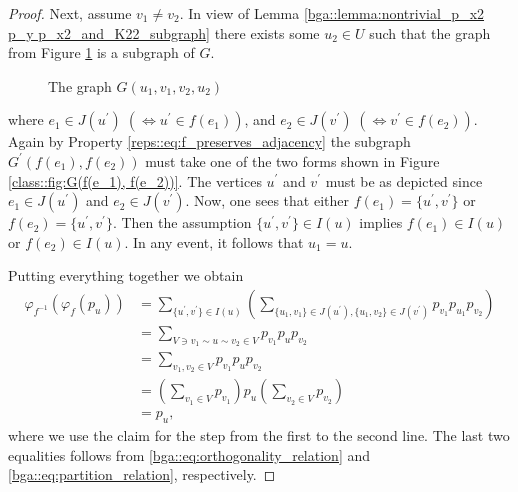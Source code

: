 \documentclass[10pt,a4paper]{amsart}
\begin{document}
\begin{proof}
    Next, assume $v_1 \neq v_2$. In view of Lemma \ref{bga::lemma:nontrivial_p_x2 p_y p_x2_and_K22_subgraph} there exists some $u_2 \in U$ such that the graph from Figure \ref{class::fig:G(u_1, v_1, v_2, u_2)} is a subgraph of $G$. %
%
    \begin{figure}[htb]
        \caption{The graph $G(u_1, v_1, v_2, u_2)$}
        \label{class::fig:G(u_1, v_1, v_2, u_2)}
    \end{figure}
%  
    where $e_1 \in J(u^\prime)\; ( \Leftrightarrow u^\prime \in f(e_1))$, and $e_2 \in J(v^\prime)\; ( \Leftrightarrow v^\prime \in f(e_2))$.
    Again by Property \eqref{reps::eq:f_preserves_adjacency} the subgraph $G^\prime(f(e_1), f(e_2))$ must take one of the two forms shown in Figure \ref{class::fig:G(f(e_1), f(e_2))}. The vertices $u^\prime$ and $v^\prime$ must be as depicted since $e_1 \in J(u^\prime)$ and $e_2 \in J(v^\prime)$. Now, one sees that either $f(e_1) = \{u^\prime, v^\prime\}$ or $f(e_2) = \{u^\prime, v^\prime\}$. Then the assumption $\{u^\prime, v^\prime\} \in I(u)$ implies $f(e_1) \in I(u)$ or $f(e_2) \in I(u)$. In any event, it follows that $u_1 = u$.

    Putting everything together we obtain
    \begin{align*}
        \varphi_{f^{-1}}(\varphi_f(p_u))
            &= \sum_{\{u^\prime, v^\prime\} \in I(u)} \left( \sum_{\{u_1, v_1\} \in J(u^\prime), \{u_1, v_2\} \in J(v^\prime)} p_{v_1} p_{u_1} p_{v_2} \right) \\
            &= \sum_{V \ni v_1 \sim u \sim v_2 \in V} p_{v_1} p_u p_{v_2} \\
            &= \sum_{v_1, v_2 \in V} p_{v_1} p_u p_{v_2} \\
            &= \left( \sum_{v_1 \in V} p_{v_1} \right) p_u \left( \sum_{v_2 \in V} p_{v_2} \right) \\
            &= p_u,
    \end{align*}
    where we use the claim for the step from the first to the second line. The last two equalities follows from \eqref{bga::eq:orthogonality_relation} and \eqref{bga::eq:partition_relation}, respectively.
\end{proof}
\end{document}
